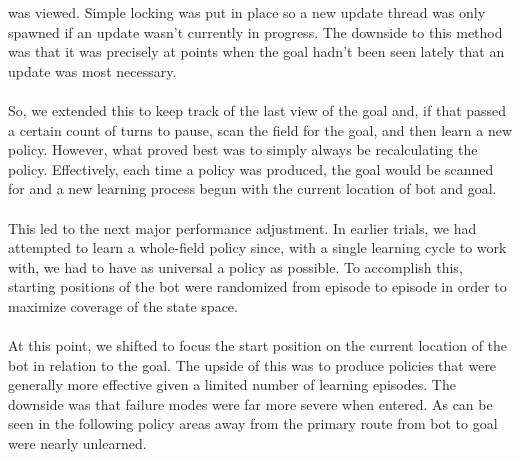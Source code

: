 \documentclass{aiaa-tc}%
\begin{document}
was viewed. Simple locking was put in place so a new update thread was
only spawned if an update wasn't currently in progress. The downside
to this method was that it was precisely at points when the goal
hadn't been seen lately that an update was most necessary. \\ \\
So, we extended this to keep track of the last view of the goal and, if
that passed a certain count of turns to pause, scan the field for the
goal, and then learn a new policy. However, what proved best was to
simply always be recalculating the policy. Effectively, each time a
policy was produced, the goal would be scanned for and a new learning
process begun with the current location of bot and goal. \\ \\
This led to the next major performance adjustment. In earlier trials,
we had attempted to learn a whole-field policy since, with a single
learning cycle to work with, we had to have as universal a policy as
possible. To accomplish this, starting positions of the bot were
randomized from episode to episode in order to maximize coverage of
the state space. \\ \\
At this point, we shifted to focus the start position
on the current location of the bot in relation to the goal. The upside
of this was to produce policies that were generally more effective
given a limited number of learning episodes. The downside was that
failure modes were far more severe when entered. As can be seen in the
following policy areas away from the primary route from bot to goal
were nearly unlearned.
\vspace{.3in}
\end{document}
